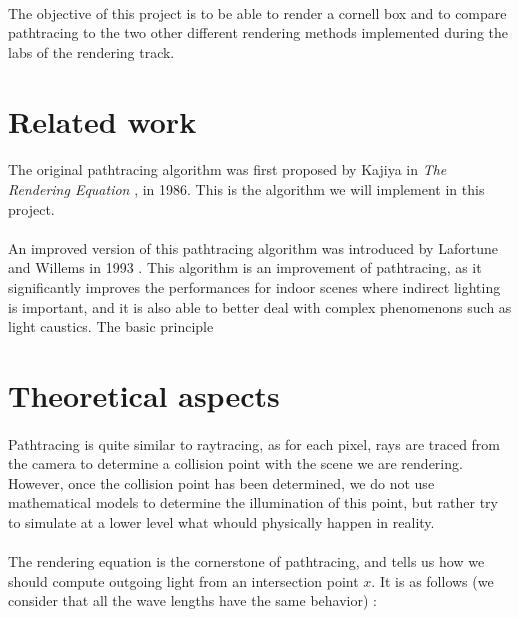 \documentclass[12pt, oneside]{report}
\begin{document}
\paragraph{}The objective of this project is to be able to render a cornell box and to compare pathtracing to the two other different rendering methods implemented during the labs of the rendering track. 

\section*{Related work}

\paragraph{}The original pathtracing algorithm was first proposed by Kajiya in \emph{The Rendering Equation} \cite{renderingEquation}, in 1986. This is the algorithm we will implement in this project.

\paragraph{}An improved version of this pathtracing algorithm was introduced by Lafortune and Willems in 1993 \cite{BDPT}. This algorithm is an improvement of pathtracing, as it significantly improves the performances for indoor scenes where indirect lighting is important, and it is also able to better deal with complex phenomenons such as light caustics. The basic principle 

\section*{Theoretical aspects}

\paragraph{}Pathtracing is quite similar to raytracing, as for each pixel, rays are traced from the camera to determine a collision point with the scene we are rendering. However, once the collision point has been determined, we do not use mathematical models to determine the illumination of this point, but rather try to simulate at a lower level what whould physically happen in reality. 

\paragraph{}The rendering equation \cite{renderingEquation} is the cornerstone of pathtracing, and tells us how we should compute outgoing light from an intersection point $x$. It is as follows (we consider that all the wave lengths have the same behavior) : 
\end{document}

